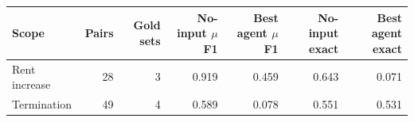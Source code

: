 \begin{tabular}{lrrrrrr}
\toprule
Scope & Pairs & Gold sets & No-input $\mu$F1 & Best agent $\mu$F1 & No-input exact & Best agent exact \\
\midrule
Rent increase & 28 & 3 & 0.919 & 0.459 & 0.643 & 0.071 \\
Termination & 49 & 4 & 0.589 & 0.078 & 0.551 & 0.531 \\
\bottomrule
\end{tabular}
